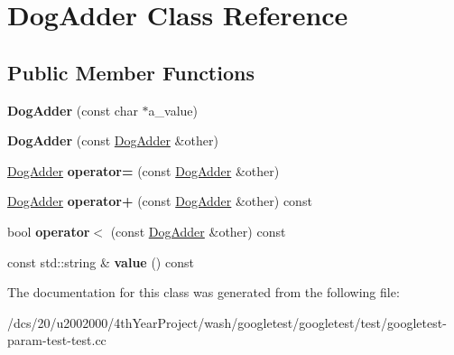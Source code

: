 \hypertarget{classDogAdder}{}\section{Dog\+Adder Class Reference}
\label{classDogAdder}
\subsection*{Public Member Functions}
\begin{DoxyCompactItemize}
\item 
\mbox{\label{classDogAdder_a7fd76a2078834dc255c7dd7ac7c58f32}} 
{\bfseries Dog\+Adder} (const char $\ast$a\+\_\+value)
\item 
\mbox{\label{classDogAdder_a35bb24b649b63f38784dcb44d55c4d94}} 
{\bfseries Dog\+Adder} (const \mbox{\hyperlink{classDogAdder}{Dog\+Adder}} \&other)
\item 
\mbox{\label{classDogAdder_a13bd773069c15b083f876b8afd512247}} 
\mbox{\hyperlink{classDogAdder}{Dog\+Adder}} {\bfseries operator=} (const \mbox{\hyperlink{classDogAdder}{Dog\+Adder}} \&other)
\item 
\mbox{\label{classDogAdder_ad667166cdafb4352396e910faf09a55f}} 
\mbox{\hyperlink{classDogAdder}{Dog\+Adder}} {\bfseries operator+} (const \mbox{\hyperlink{classDogAdder}{Dog\+Adder}} \&other) const
\item 
\mbox{\label{classDogAdder_a6d87d3ee06c0167e7552ba83daa629e7}} 
bool {\bfseries operator$<$} (const \mbox{\hyperlink{classDogAdder}{Dog\+Adder}} \&other) const
\item 
\mbox{\label{classDogAdder_a76bb9e42f79e9d4adacd9e48a3a3c9fb}} 
const std\+::string \& {\bfseries value} () const
\end{DoxyCompactItemize}


The documentation for this class was generated from the following file\+:\begin{DoxyCompactItemize}
\item 
/dcs/20/u2002000/4th\+Year\+Project/wash/googletest/googletest/test/googletest-\/param-\/test-\/test.\+cc\end{DoxyCompactItemize}
